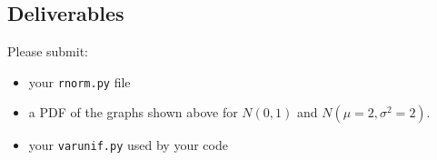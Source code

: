 \begin{fullwidth}
\section{Deliverables}

Please submit:

\begin{itemize}
\item your {\tt rnorm.py} file
\item a PDF of the graphs shown above for $N(0,1)$ and $N(\mu=2,\sigma^2=2)$.
\item your {\tt varunif.py} used by your code

\end{itemize}

\end{fullwidth}

